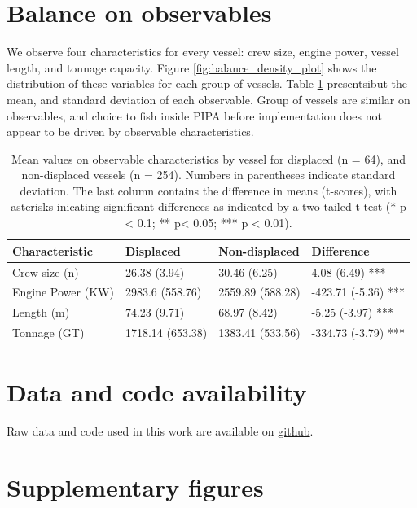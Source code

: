 \documentclass[12pt]{article}
\begin{document}
\section{Balance on observables}

We observe four characteristics for every vessel: crew size, engine power, vessel length, and tonnage capacity. Figure \ref{fig:balance_density_plot} shows the distribution of these variables for each group of vessels. Table \ref{tab:balance_table} presentsibut the mean, and standard deviation of each observable. Group of vessels are similar on observables, and choice to fish inside PIPA before implementation does not appear to be driven by observable characteristics.

\begin{table}[H]

\caption{\label{tab:balance_table}Mean values on observable characteristics by vessel for displaced (n = 64), and non-displaced vessels (n = 254). Numbers in parentheses indicate standard deviation. The last column contains the difference in means (t-scores), with asterisks inicating significant differences as indicated by a two-tailed t-test (* p < 0.1; ** p< 0.05; *** p < 0.01).}
\centering
\begin{tabular}{l|l|l|l}
\hline
Characteristic & Displaced & Non-displaced & Difference\\
\hline
Crew size (n) & 26.38 (3.94) & 30.46 (6.25) & 4.08 (6.49) ***\\
\hline
Engine Power (KW) & 2983.6 (558.76) & 2559.89 (588.28) & -423.71 (-5.36) ***\\
\hline
Length (m) & 74.23 (9.71) & 68.97 (8.42) & -5.25 (-3.97) ***\\
\hline
Tonnage (GT) & 1718.14 (653.38) & 1383.41 (533.56) & -334.73 (-3.79) ***\\
\hline
\end{tabular}
\end{table}

\section{Data and code availability}

Raw data and code used in this work are available on \href{https://github.com/jcvdav/MPA_displacement}{github}.

\clearpage

\FloatBarrier

\section{Supplementary figures}
\end{document}
